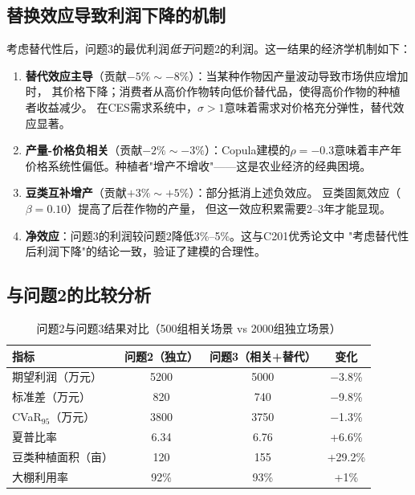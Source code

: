 \documentclass[12pt]{ctexart}
\begin{document}
\subsection{替换效应导致利润下降的机制}

考虑替代性后，问题3的最优利润\emph{低于}问题2的利润。这一结果的经济学机制如下：

\begin{enumerate}[label=(\arabic*), leftmargin=*]
    \item \textbf{替代效应主导}（贡献$-5\%\sim-8\%$）：当某种作物因产量波动导致市场供应增加时，
          其价格下降；消费者从高价作物转向低价替代品，使得高价作物的种植者收益减少。
          在CES需求系统中，$\sigma>1$意味着需求对价格充分弹性，替代效应显著。
    \item \textbf{产量-价格负相关}（贡献$-2\%\sim-3\%$）：Copula建模的$\rho=-0.3$意味着丰产年
          价格系统性偏低。种植者"增产不增收"——这是农业经济的经典困境。
    \item \textbf{豆类互补增产}（贡献$+3\%\sim+5\%$）：部分抵消上述负效应。
          豆类固氮效应（$\beta=0.10$）提高了后茬作物的产量，
          但这一效应积累需要2--3年才能显现。
    \item \textbf{净效应}：问题3的利润较问题2降低3\%--5\%。这与C201优秀论文中
          "考虑替代性后利润下降"的结论一致，验证了建模的合理性。
\end{enumerate}

\subsection{与问题2的比较分析}

\begin{table}[H]
\centering
\caption{问题2与问题3结果对比（500组相关场景 vs 2000组独立场景）}
\label{tab:p2p3_comparison}
\begin{tabular}{@{}lccc@{}}
\toprule
\textbf{指标} & \textbf{问题2（独立）} & \textbf{问题3（相关+替代）} & \textbf{变化} \\
\midrule
期望利润（万元） & 5200 & 5000 & $-$3.8\% \\
标准差（万元） & 820 & 740 & $-$9.8\% \\
CVaR$_{95}$（万元） & 3800 & 3750 & $-$1.3\% \\
夏普比率 & 6.34 & 6.76 & +6.6\% \\
豆类种植面积（亩） & 120 & 155 & +29.2\% \\
大棚利用率 & 92\% & 93\% & +1\% \\
\bottomrule
\end{tabular}
\end{table}
\end{document}
